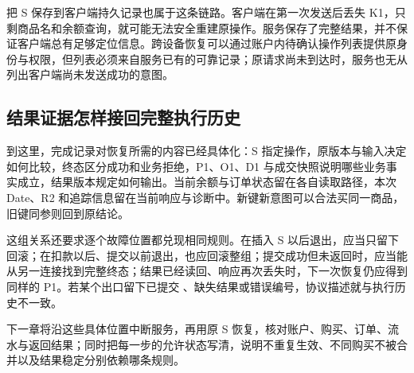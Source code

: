 把 S 保存到客户端持久记录也属于这条链路。客户端在第一次发送后丢失 K1，只剩商品名和余额查询，就可能无法安全重建原操作。服务保存了完整结果，并不保证客户端总有足够定位信息。跨设备恢复可以通过账户内待确认操作列表提供原身份与权限，但列表必须来自服务已有的可靠记录；原请求尚未到达时，服务也无从列出客户端尚未发送成功的意图。

\subsection*{结果证据怎样接回完整执行历史}

到这里，完成记录对恢复所需的内容已经具体化：S 指定操作，原版本与输入决定如何比较，终态区分成功和业务拒绝，P1、O1、D1 与成交快照说明哪些业务事实成立，结果版本规定如何输出。当前余额与订单状态留在各自读取路径，本次 Date、R2 和追踪信息留在当前响应与诊断中。新键新意图可以合法买同一商品，旧键同参则回到原结论。

这组关系还要求逐个故障位置都兑现相同规则。在插入 S 以后退出，应当只留下回滚；在扣款以后、提交以前退出，也应回滚整组；提交成功但未返回时，应当能从另一连接找到完整终态；结果已经读回、响应再次丢失时，下一次恢复仍应得到同样的 P1。若某个出口留下已提交 、缺失结果或错误编号，协议描述就与执行历史不一致。

下一章将沿这些具体位置中断服务，再用原 S 恢复，核对账户、购买、订单、流水与返回结果；同时把每一步的允许状态写清，说明不重复生效、不同购买不被合并以及结果稳定分别依赖哪条规则。
\FloatBarrier
